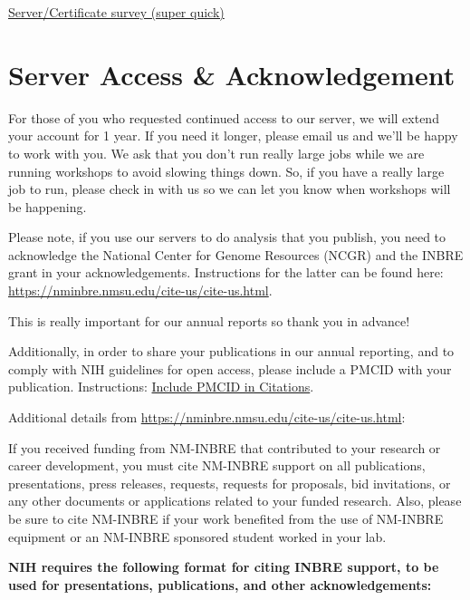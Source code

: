 \documentclass[
]{book}
\begin{document}
\href{https://docs.google.com/forms/d/e/1FAIpQLSfGZwX2BL_ZyGgmvh4v41Q_886y-OiTESTbpvzoyR0J3BxC5Q/viewform?usp=sf_link}{Server/Certificate survey (super quick)}

\hypertarget{server-access-acknowledgement}{%
\chapter*{Server Access \& Acknowledgement}\label{server-access-acknowledgement}}

For those of you who requested continued access to our server, we will extend your account for 1 year. If you need it longer, please email us and we'll be happy to work with you. We ask that you don't run really large jobs while we are running workshops to avoid slowing things down. So, if you have a really large job to run, please check in with us so we can let you know when workshops will be happening.

Please note, if you use our servers to do analysis that you publish, you need to acknowledge the National Center for Genome Resources (NCGR) and the INBRE grant in your acknowledgements. Instructions for the latter can be found here: \url{https://nminbre.nmsu.edu/cite-us/cite-us.html}.

This is really important for our annual reports so thank you in advance!

Additionally, in order to share your publications in our annual reporting, and to comply with NIH guidelines for open access, please include a PMCID with your publication. Instructions: \href{https://publicaccess.nih.gov/include-pmcid-citations.htm}{Include PMCID in Citations}.

Additional details from \url{https://nminbre.nmsu.edu/cite-us/cite-us.html}:

{If you received funding from NM-INBRE that contributed to your research or career development, you must cite NM-INBRE support on all publications, presentations, press releases, requests, requests for proposals, bid invitations, or any other documents or applications related to your funded research. Also, please be sure to cite NM-INBRE if your work benefited from the use of NM-INBRE equipment or an NM-INBRE sponsored student worked in your lab.}

{\textbf{NIH requires the following format for citing INBRE support, to be used for presentations, publications, and other acknowledgements:}}
\end{document}
